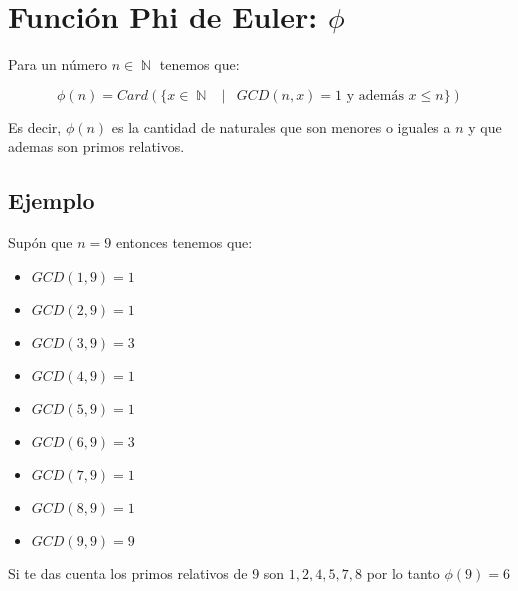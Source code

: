 \documentclass[12pt]{report}                                    %
\DeclareMathOperator \Space {\quad}                             %
\DeclareMathOperator \MiniSpace {\;}                            %
\newcommand \Such {\MiniSpace|\MiniSpace}                       %
\DeclareMathOperator \Naturals  {\mathbb{N}}                     %
\begin{document}
    \clearpage
    \section{Función Phi de Euler: $\phi$ }

        Para un número $n \in \Naturals$ tenemos que:

        \begin{equation}
            \phi(n) = 
                Card(
                    \{ x \in \Naturals \Such
                        GCD(n, x) = 1
                        \text{ y además } x \leq n
                    \}
                )
        \end{equation}
 
        Es decir, $\phi(n)$ es la cantidad de naturales que son menores o iguales a
        $n$ y que ademas son primos relativos.




        \clearpage
        \subsection{Ejemplo}
            
            Supón que $n=9$ entonces tenemos que:

            \begin{itemize}
                \item $GCD(1, 9) = 1$
                \item $GCD(2, 9) = 1$
                \item $GCD(3, 9) = 3$
                \item $GCD(4, 9) = 1$
                \item $GCD(5, 9) = 1$
                \item $GCD(6, 9) = 3$
                \item $GCD(7, 9) = 1$
                \item $GCD(8, 9) = 1$
                \item $GCD(9, 9) = 9$
            \end{itemize}

            Si te das cuenta los primos relativos de 9 son $1,2,4,5,7,8$
            por lo tanto $\phi(9) = 6$
\end{document}
